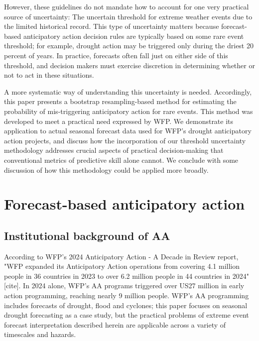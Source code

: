 \documentclass{ametsocV5}
\begin{document}
However, these guidelines do not mandate how to account for one very practical source of uncertainty: The uncertain threshold for extreme weather events due to the limited historical record. This type of uncertainty matters because forecast-based anticipatory action decision rules are typically based on some rare event threshold; for example, drought action may be triggered only during the driest 20 percent of years. In practice, forecasts often fall just on either side of this threshold, and decision makers must exercise discretion in determining whether or not to act in these situations. 

A more systematic way of understanding this uncertainty is needed. Accordingly, this paper presents a bootstrap resampling-based method for estimating the probability of mis-triggering anticipatory action for rare events. This method was developed to meet a practical need expressed by WFP. We demonstrate its application to actual seasonal forecast data used for WFP's drought anticipatory action projects, and discuss how the incorporation of our threshold uncertainty methodology addresses crucial aspects of practical decision-making that conventional metrics of predictive skill alone cannot. We conclude with some discussion of how this methodology could be applied more broadly.  

\section{Forecast-based anticipatory action}

\subsection{Institutional background of AA}


According to WFP's 2024 Anticipatory Action - A Decade in Review report, "WFP expanded its Anticipatory Action operations from covering 4.1 million people in 36 countries in 2023 to over 6.2 million people in 44 countries in 2024" [cite]. In 2024 alone, WFP's AA programs triggered over US27 million in early action programming, reaching nearly 9 million people. WFP's AA programming includes forecasts of drought, flood and cyclones; this paper focuses on seasonal drought forecasting as a case study, but the practical problems of extreme event forecast interpretation described herein are applicable across a variety of timescales and hazards.
\end{document}
